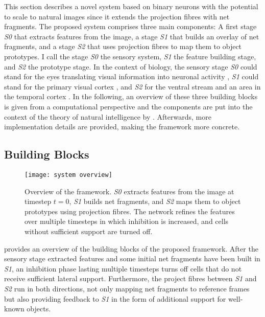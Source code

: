 This section describes a novel system based on binary neurons with the potential to scale to natural images since it extends the projection fibres with net fragments.
The proposed system comprises three main components: A first stage \emph{S0} that extracts features from the image, a stage \emph{S1} that builds an overlay of net fragments, and a stage \emph{S2} that uses projection fibres to map them to object prototypes.
I call the stage \emph{S0} the sensory system, \emph{S1} the feature building stage, and \emph{S2} the prototype stage.
In the context of biology, the sensory stage \emph{S0} could stand for the eyes translating visual information into neuronal activity , \emph{S1} could stand for the primary visual cortex , and \emph{S2} for the ventral stream  and an area in the temporal cortex .
In the following, an overview of these three building blocks is given from a computational perspective and the components are put into the context of the theory of natural intelligence by .
Afterwards, more implementation details are provided, making the framework more concrete.

\subsection{Building Blocks}
\begin{figure}[h]
    \centering
    \texttt{[image: system overview]}
    \caption[Overview of the framework]{Overview of the framework. \emph{S0} extracts features from the image at timestep $t=0$, \emph{S1} builds net fragments, and \emph{S2} maps them to object prototypes using projection fibres. The network refines the features over multiple timesteps in which inhibition is increased, and cells without sufficient support are turned off.}
\end{figure}

 provides an overview of the building blocks of the proposed framework. After the sensory stage extracted features and some initial net fragments have been built in \emph{S1}, an inhibition phase  lasting multiple timesteps turns off cells that do not receive sufficient lateral support. Furthermore, the project fibres  between \emph{S1} and \emph{S2} run in both directions, not only mapping net fragments to reference frames but also providing feedback to \emph{S1} in the form of additional support for well-known objects.

